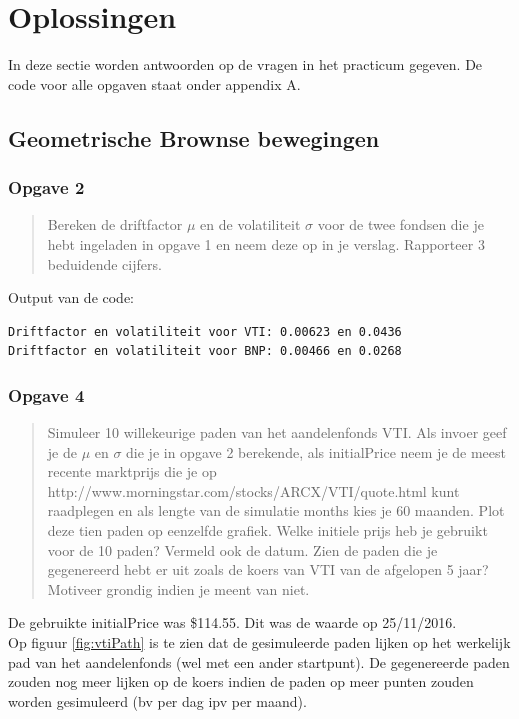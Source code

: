\documentclass[11pt, a4paper, titlepage, openright]{article}
\begin{document}

\tableofcontents
\newpage

\section{Oplossingen}
	In deze sectie worden antwoorden op de vragen in het practicum gegeven. De code voor alle opgaven staat onder appendix A.
	
	\subsection{Geometrische Brownse bewegingen}
	
	\subsubsection{Opgave 2}
		\begin{quote}
			Bereken de driftfactor \( \mu \) en de volatiliteit \( \sigma \) voor de twee fondsen die je hebt ingeladen in opgave 1 en
			neem deze op in je verslag. Rapporteer 3 beduidende cijfers.
		\end{quote}
		
		\noindent Output van de code:
\begin{lstlisting}
Driftfactor en volatiliteit voor VTI: 0.00623 en 0.0436
Driftfactor en volatiliteit voor BNP: 0.00466 en 0.0268\end{lstlisting}
		
	
	\subsubsection{Opgave 4}
		\begin{quote}
			Simuleer 10 willekeurige paden van het aandelenfonds VTI. Als invoer geef je de \( \mu \) en \( \sigma \) 
			die je in opgave 2 berekende, als initialPrice neem je de meest recente marktprijs die je op 
			http://www.morningstar.com/stocks/ARCX/VTI/quote.html kunt raadplegen en als lengte van de simulatie 
			months kies je 60 maanden. Plot deze tien paden op eenzelfde grafiek. Welke initiele prijs heb je 
			gebruikt voor de 10 paden? Vermeld ook de datum. Zien de paden die je gegenereerd hebt er uit 
			zoals de koers van VTI van de afgelopen 5 jaar? Motiveer grondig indien je meent van niet.
		\end{quote}
		
		\noindent De gebruikte initialPrice was \$114.55. Dit was de waarde op 25/11/2016. \\
		Op figuur \ref{fig:vtiPath} is te zien dat de gesimuleerde paden lijken op het werkelijk pad van het aandelenfonds (wel met een ander startpunt).
		De gegenereerde paden zouden nog meer lijken op de koers indien de paden op meer punten zouden worden gesimuleerd (bv per dag ipv per maand).
		
\end{document}
